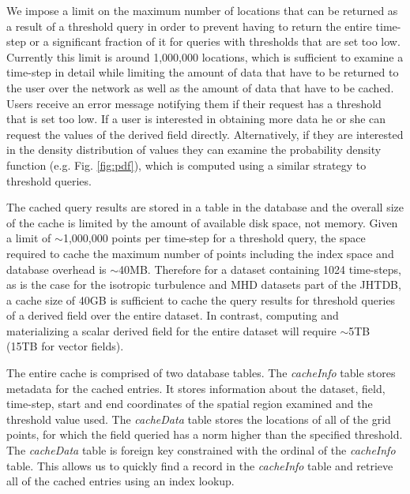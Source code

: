 \documentclass{sig-alternate}
\begin{document}
We impose a limit on the maximum number of locations that can be returned as a result of a threshold query in order to prevent having to return
the entire time-step or a significant fraction of it for queries with thresholds that are set too low. Currently this limit is around 1,000,000 locations, which is
sufficient to examine a time-step in detail while limiting the amount of data that have to be returned to the user over the network as well as the amount of
data that have to be cached. Users receive an error message notifying them if their request has a threshold that is set too low. If a user
is interested in obtaining more data he or she can request the values of the derived field directly. Alternatively, if they are interested in the density distribution
of values they can examine the probability density function (e.g. Fig. \ref{fig:pdf}), which is computed using a similar strategy to threshold queries.

The cached query results are stored in a table in the database and the overall size of the cache is limited by the amount of available disk space, not memory.
Given a limit of $\sim$1,000,000 points per time-step for a threshold query, the space required to cache the maximum number of points including the index
space and database overhead is $\sim$40MB. 
Therefore for a dataset containing 
1024 time-steps, as is the case for the isotropic turbulence and MHD datasets part of the JHTDB, a cache size of 40GB is sufficient to cache the query
results for threshold queries of a derived field over the entire dataset. In contrast, computing and materializing a scalar derived field for the entire dataset will
require $\sim$5TB (15TB for vector fields).

The entire cache is comprised of two database tables. The {\it cacheInfo} table stores metadata for the cached entries. It stores information about the
dataset, field, time-step, start and end coordinates of the spatial region examined and the threshold value used. The {\it cacheData} table stores the locations
of all of the grid points, for which the field queried has a norm higher than the specified threshold. The {\it cacheData} table is foreign key constrained with
the ordinal of the {\it cacheInfo} table. This allows us to quickly find a record in the {\it cacheInfo} table and retrieve all of the cached entries using an index
lookup.
\end{document}
